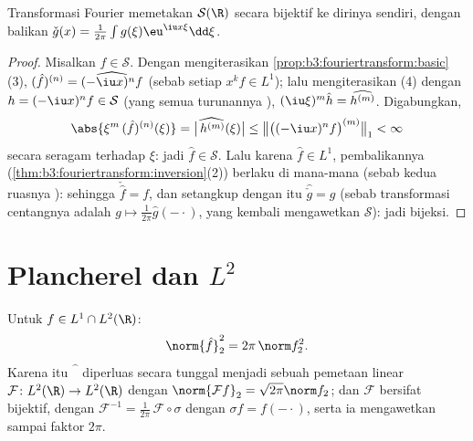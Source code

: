 \begin{theorem}\label{thm:b3:fouriertransform:schwartz}
Transformasi Fourier memetakan $\mathcal S(\R)$ secara bijektif ke
dirinya sendiri, dengan balikan $\check g(x) = \frac1{2\pi}\int
g(\xi)\eu^{\iu x\xi}\dd\xi$.
\end{theorem}

\begin{proof}
Misalkan $f \in \mathcal S$. Dengan mengiterasikan
\cref{prop:b3:fouriertransform:basic}(3), $(\hat f)^{(n)} =
\widehat{(-\iu x)^nf}$ (sebab setiap $x^kf \in L^1$); lalu mengiterasikan (4)
dengan $h = (-\iu x)^nf \in \mathcal S$ (yang semua
turunannya ), $(\iu\xi)^m\hat h =
\widehat{h^{(m)}}$. Digabungkan,
\[
\abs{\xi^m\,(\hat f)^{(n)}(\xi)}
= \bigl|\widehat{\,h^{(m)}}(\xi)\bigr|
\leq \bigl\|\bigl((-\iu x)^nf\bigr)^{(m)}\bigr\|_1 < \infty
\]
secara seragam terhadap $\xi$: jadi $\hat f \in \mathcal S$. Lalu karena $\hat f \in L^1$, pembalikannya
(\cref{thm:b3:fouriertransform:inversion}(2)) berlaku
di mana-mana (sebab kedua ruasnya ): sehingga $\check{\hat f} = f$, dan
setangkup dengan itu $\widehat{\check g} = g$ (sebab transformasi centangnya
adalah $g \mapsto \frac1{2\pi}\hat g(-\cdot)$, yang kembali mengawetkan
$\mathcal S$): jadi bijeksi.
\end{proof}

\section{Plancherel dan \texorpdfstring{$L^2$}{L2}}

\begin{theorem}[Plancherel]\label{thm:b3:fouriertransform:plancherel}
Untuk $f \in L^1 \cap L^2(\R)$:
\[
\norm{\hat f}_2^2 = 2\pi\,\norm f_2^2 .
\]
Karena itu $\widehat{\phantom f}$ diperluas secara tunggal menjadi sebuah
pemetaan linear  $\mathcal F \colon L^2(\R) \to L^2(\R)$
dengan $\norm{\mathcal Ff}_2 = \sqrt{2\pi}\norm f_2$; dan $\mathcal
F$ bersifat bijektif, dengan $\mathcal F^{-1} =
\frac1{2\pi}\,\mathcal F\circ\sigma$ dengan $\sigma f =
f(-\cdot)$, serta ia mengawetkan  sampai faktor
$2\pi$.
\end{theorem}

